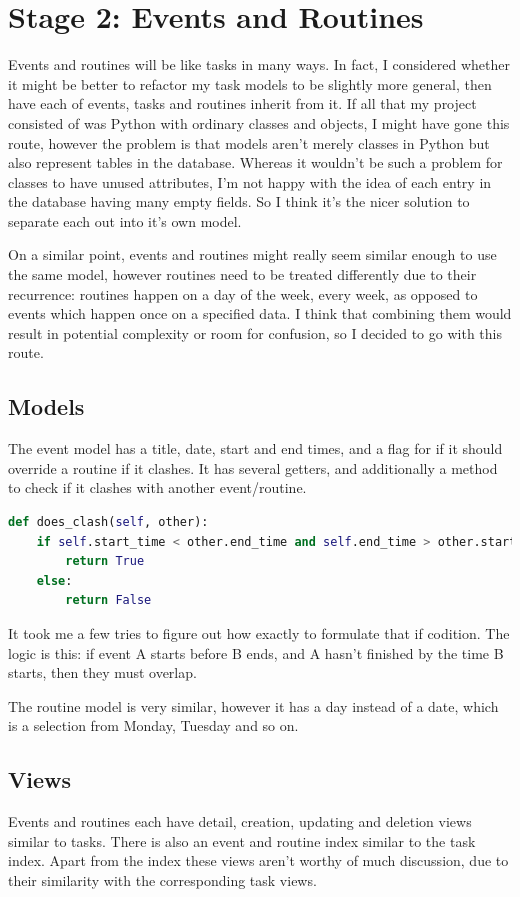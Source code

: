 \documentclass{article}
\begin{document}
\section{Stage 2: Events and Routines}
Events and routines will be like tasks in many ways.
In fact,
I considered whether it might be better to refactor my task models to be slightly more general,
then have each of events, tasks and routines inherit from it.
If all that my project consisted of was Python with ordinary classes and objects,
I might have gone this route,
however the problem is that models aren't merely classes in Python but also represent tables in the database.
Whereas it wouldn't be such a problem for classes to have unused attributes,
I'm not happy with the idea of each entry in the database having many empty fields.
So I think it's the nicer solution to separate each out into it's own model.

On a similar point,
events and routines might really seem similar enough to use the same model,
however routines need to be treated differently due to their recurrence:
routines happen on a day of the week,
every week,
as opposed to events which happen once on a specified data.
I think that combining them would result in potential complexity or room for confusion,
so I decided to go with this route.

\subsection{Models}
The event model has a title, date, start and end times,
and a flag for if it should override a routine if it clashes.
It has several getters,
and additionally a method to check if it clashes with another event/routine.

\begin{lstlisting}[language=Python, breaklines]
def does_clash(self, other):
    if self.start_time < other.end_time and self.end_time > other.start_time:
        return True
    else:
        return False
\end{lstlisting}

It took me a few tries to figure out how exactly to formulate that if codition.
The logic is this:
if event A starts before B ends,
and A hasn't finished by the time B starts,
then they must overlap.

The routine model is very similar,
however it has a day instead of a date,
which is a selection from Monday, Tuesday and so on.

\subsection{Views}
Events and routines each have detail, creation, updating and deletion views similar to tasks.
There is also an event and routine index similar to the task index.
Apart from the index these views aren't worthy of much discussion,
due to their similarity with the corresponding task views.
\end{document}
